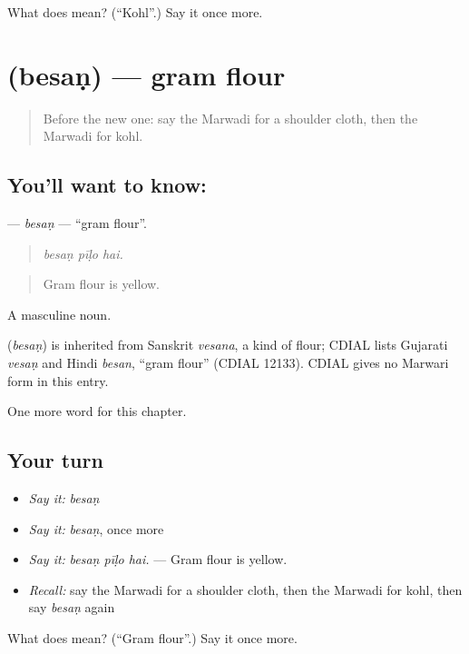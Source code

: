 \begin{tcolorbox}[breakable,colback=teal!4,colframe=teal!35!black,title={Before you move on}]
What does  mean? (\textquotedblleft{}Kohl\textquotedblright{}.) Say it once more.
\end{tcolorbox}
\section[\texorpdfstring{\mw{बेसण} (besaṇ)}{बेसण (besaṇ)}]{ (besaṇ) — gram flour}

\label{lesson:MW-C183-besan}



\begin{quote}
Before the new one: say the Marwadi for a shoulder cloth, then the Marwadi for kohl.
\end{quote}

\subsection*{You'll want to know: }
\textbf{} — \emph{besaṇ} — \textquotedblleft{}gram flour\textquotedblright{}.

\begin{quote}
  
\end{quote}

\begin{quote}
\emph{besaṇ pīḷo hai.}
\end{quote}

\begin{quote}
Gram flour is yellow.
\end{quote}

A masculine noun.

\begin{cousinweb}
\textbf{} (\emph{besaṇ}) is inherited from Sanskrit \emph{vesana}, a kind of flour; CDIAL lists Gujarati \emph{vesaṇ} and Hindi \emph{besan}, \textquotedblleft{}gram flour\textquotedblright{} (CDIAL 12133). CDIAL gives no Marwari form in this entry.
\end{cousinweb}

\begin{grammarlens}[title={What you've built}]
One more word for this chapter.
\end{grammarlens}

\subsection*{Your turn}
\begin{itemize}
\raggedright
  \item \emph{Say it:} \emph{besaṇ}
  \item \emph{Say it:} \emph{besaṇ}, once more
  \item \emph{Say it:} \emph{besaṇ pīḷo hai.} — Gram flour is yellow.
  \item \emph{Recall:} say the Marwadi for a shoulder cloth, then the Marwadi for kohl, then say \emph{besaṇ} again
\end{itemize}

\begin{tcolorbox}[breakable,colback=teal!4,colframe=teal!35!black,title={Before you move on}]
What does  mean? (\textquotedblleft{}Gram flour\textquotedblright{}.) Say it once more.
\end{tcolorbox}
